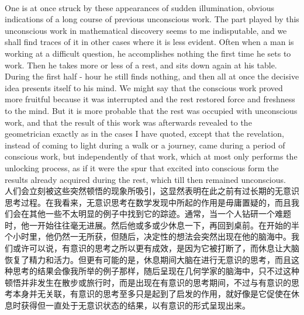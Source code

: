 \documentclass{article}
\begin{document}
\\
One is at once struck by these appearances of sudden illumination, obvious indications of a long course of previous unconscious work. The part played by this unconscious work in mathematical discovery seems to me indisputable, and we shall find traces of it in other cases where it is less evident. Often when a man is working at a difficult question, he accomplishes nothing the first time he sets to work. Then he takes more or less of a rest, and sits down again at his table. During the first half - hour he still finds nothing, and then all at once the decisive idea presents itself to his mind. We might say that the conscious work proved more fruitful because it was interrupted and the rest restored force and freshness to the mind. But it is more probable that the rest was occupied with unconscious work, and that the result of this work was afterwards revealed to the geometrician exactly as in the cases I have quoted, except that the revelation, instead of coming to light during a walk or a journey, came during a period of conscious work, but independently of that work, which at most only performs the unlocking process, as if it were the spur that excited into conscious form the results already acquired during the rest, which till then remained unconscious.\\
人们会立刻被这些突然顿悟的现象所吸引，这显然表明在此之前有过长期的无意识思考过程。在我看来，无意识思考在数学发现中所起的作用是毋庸置疑的，而且我们会在其他一些不太明显的例子中找到它的踪迹。通常，当一个人钻研一个难题时，他一开始往往毫无进展。然后他或多或少休息一下，再回到桌前。在开始的半个小时里，他仍然一无所获，但随后，决定性的想法会突然出现在他的脑海中。我们或许可以说，有意识的思考之所以更有成效，是因为它被打断了，而休息让大脑恢复了精力和活力。但更有可能的是，休息期间大脑在进行无意识的思考，而且这种思考的结果会像我所举的例子那样，随后呈现在几何学家的脑海中，只不过这种顿悟并非发生在散步或旅行时，而是出现在有意识的思考期间，不过与有意识的思考本身并无关联，有意识的思考至多只是起到了启发的作用，就好像是它促使在休息时获得但一直处于无意识状态的结果，以有意识的形式呈现出来。\\ 
\end{document}
